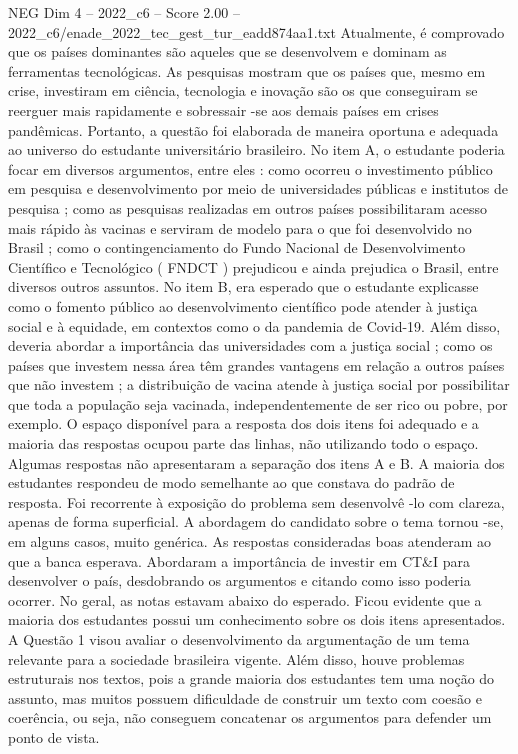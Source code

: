 \begin{textsample}{NEG Dim 4 – 2022\_c6 – Score 2.00 – 2022\_c6/enade\_2022\_tec\_gest\_tur\_eadd874aa1.txt}
Atualmente, é comprovado que os países dominantes são aqueles que se desenvolvem e dominam as ferramentas tecnológicas.
As pesquisas mostram que os países que, mesmo em crise, investiram em ciência, tecnologia e inovação são os que conseguiram se reerguer mais rapidamente e sobressair -se aos demais países em crises pandêmicas.
Portanto, a questão foi elaborada de maneira oportuna e adequada ao universo do estudante universitário brasileiro.
No item A, o estudante poderia focar em diversos argumentos, entre eles : como ocorreu o investimento público em pesquisa e desenvolvimento por meio de universidades públicas e institutos de pesquisa ; como as pesquisas realizadas em outros países possibilitaram acesso mais rápido às vacinas e serviram de modelo para o que foi desenvolvido no Brasil ; como o contingenciamento do Fundo Nacional de Desenvolvimento Científico e Tecnológico ( FNDCT ) prejudicou e ainda prejudica o Brasil, entre diversos outros assuntos.
No item B, era esperado que o estudante explicasse como o fomento público ao desenvolvimento científico pode atender à justiça social e à equidade, em contextos como o da pandemia de Covid-19.
Além disso, deveria abordar a importância das universidades com a justiça social ; como os países que investem nessa área têm grandes vantagens em relação a outros países que não investem ; a distribuição de vacina atende à justiça social por possibilitar que toda a população seja vacinada, independentemente de ser rico ou pobre, por exemplo.
O espaço disponível para a resposta dos dois itens foi adequado e a maioria das respostas ocupou parte das linhas, não utilizando todo o espaço.
Algumas respostas não apresentaram a separação dos itens A e B.
A maioria dos estudantes respondeu de modo semelhante ao que constava do padrão de resposta.
Foi recorrente à exposição do problema sem desenvolvê -lo com clareza, apenas de forma superficial.
A abordagem do candidato sobre o tema tornou -se, em alguns casos, muito genérica.
As respostas consideradas boas atenderam ao que a banca esperava.
Abordaram a importância de investir em CT\&I para desenvolver o país, desdobrando os argumentos e citando como isso poderia ocorrer.
No geral, as notas estavam abaixo do esperado.
Ficou evidente que a maioria dos estudantes possui um conhecimento sobre os dois itens apresentados.
A Questão 1 visou avaliar o desenvolvimento da argumentação de um tema relevante para a sociedade brasileira vigente.
Além disso, houve problemas estruturais nos textos, pois a grande maioria dos estudantes tem uma noção do assunto, mas muitos possuem dificuldade de construir um texto com coesão e coerência, ou seja, não conseguem concatenar os argumentos para defender um ponto de vista.

\end{textsample}
